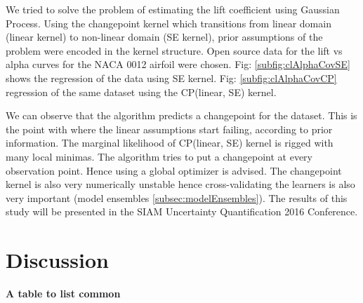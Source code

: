 We tried to solve the problem of estimating the lift coefficient using Gaussian Process. Using the changepoint kernel which transitions from linear domain (linear kernel) to non-linear domain (SE kernel), prior assumptions of the problem were encoded in the kernel structure. Open source data for the lift vs alpha curves for the NACA 0012 airfoil were chosen. Fig: \ref{subfig:clAlphaCovSE} shows the regression of the data using SE kernel. Fig: \ref{subfig:clAlphaCovCP} regression of the same dataset using the CP(linear, SE) kernel. 

We can observe that the algorithm predicts a changepoint for the dataset. This is the point with where the linear assumptions start failing, according to prior information. The marginal likelihood of CP(linear, SE) kernel is rigged with many local minimas. The algorithm tries to put a changepoint at every observation point. Hence using a global optimizer is advised. The changepoint kernel is also very numerically unstable hence cross-validating the learners is also very important (model ensembles \ref{subsec:modelEnsembles}). The results of this study will be presented in the SIAM Uncertainty Quantification 2016 Conference.


\section{Discussion}

\textbf{A table to list common  }

